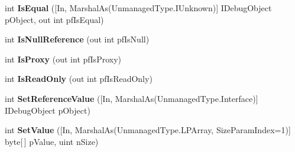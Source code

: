 \begin{DoxyCompactItemize}
\item 
\hypertarget{interface_microsoft_1_1_visual_studio_1_1_debugger_1_1_interop_e_e_1_1_i_debug_object2_aba6af4dc7cdbf5f6d2f90e587455fa84}{int {\bfseries Is\+Equal} (\mbox{[}In, Marshal\+As(Unmanaged\+Type.\+I\+Unknown)\mbox{]} I\+Debug\+Object p\+Object, out int pf\+Is\+Equal)}\label{interface_microsoft_1_1_visual_studio_1_1_debugger_1_1_interop_e_e_1_1_i_debug_object2_aba6af4dc7cdbf5f6d2f90e587455fa84}

\item 
\hypertarget{interface_microsoft_1_1_visual_studio_1_1_debugger_1_1_interop_e_e_1_1_i_debug_object2_aa6c6a35d2b4d834ba9f94bd0a221db73}{int {\bfseries Is\+Null\+Reference} (out int pf\+Is\+Null)}\label{interface_microsoft_1_1_visual_studio_1_1_debugger_1_1_interop_e_e_1_1_i_debug_object2_aa6c6a35d2b4d834ba9f94bd0a221db73}

\item 
\hypertarget{interface_microsoft_1_1_visual_studio_1_1_debugger_1_1_interop_e_e_1_1_i_debug_object2_a15a7c257c56857b4f5c29bc4be8e0e35}{int {\bfseries Is\+Proxy} (out int pf\+Is\+Proxy)}\label{interface_microsoft_1_1_visual_studio_1_1_debugger_1_1_interop_e_e_1_1_i_debug_object2_a15a7c257c56857b4f5c29bc4be8e0e35}

\item 
\hypertarget{interface_microsoft_1_1_visual_studio_1_1_debugger_1_1_interop_e_e_1_1_i_debug_object2_a309c139058d36c5e2cd204eb48c09554}{int {\bfseries Is\+Read\+Only} (out int pf\+Is\+Read\+Only)}\label{interface_microsoft_1_1_visual_studio_1_1_debugger_1_1_interop_e_e_1_1_i_debug_object2_a309c139058d36c5e2cd204eb48c09554}

\item 
\hypertarget{interface_microsoft_1_1_visual_studio_1_1_debugger_1_1_interop_e_e_1_1_i_debug_object2_a69ceec5d9a8d60896f4d51970b517799}{int {\bfseries Set\+Reference\+Value} (\mbox{[}In, Marshal\+As(Unmanaged\+Type.\+Interface)\mbox{]} I\+Debug\+Object p\+Object)}\label{interface_microsoft_1_1_visual_studio_1_1_debugger_1_1_interop_e_e_1_1_i_debug_object2_a69ceec5d9a8d60896f4d51970b517799}

\item 
\hypertarget{interface_microsoft_1_1_visual_studio_1_1_debugger_1_1_interop_e_e_1_1_i_debug_object2_a58b604b40431f9c06f49e30dde00e492}{int {\bfseries Set\+Value} (\mbox{[}In, Marshal\+As(Unmanaged\+Type.\+L\+P\+Array, Size\+Param\+Index=1)\mbox{]} byte\mbox{[}$\,$\mbox{]} p\+Value, uint n\+Size)}\label{interface_microsoft_1_1_visual_studio_1_1_debugger_1_1_interop_e_e_1_1_i_debug_object2_a58b604b40431f9c06f49e30dde00e492}


\end{DoxyCompactItemize}
